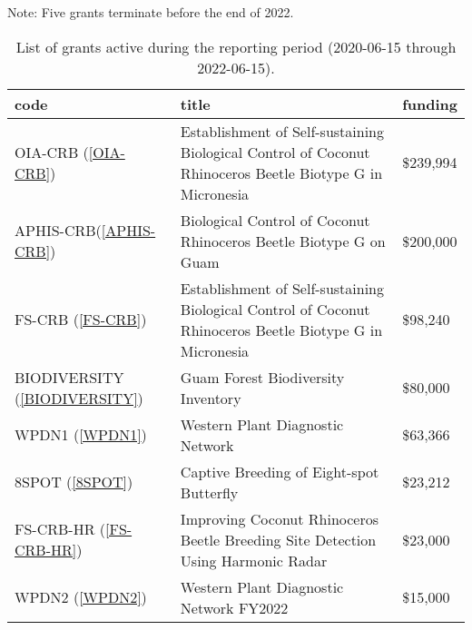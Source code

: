 Note: Five grants terminate before the end of 2022.

\begin{table}[h!]
	\centering
	\caption{List of grants active during the reporting period (2020-06-15 through 2022-06-15).}
	\label{grantlist}
	\begin{tabular}{lp{3in}>{\raggedleft\arraybackslash}l}
		\toprule
		code &                                                                                                    title &  funding \\
		\midrule
		OIA-CRB (\ref{OIA-CRB}) & Establishment of Self-sustaining Biological Control of Coconut Rhinoceros Beetle Biotype G in Micronesia & \$239,994 \\
		\midrule
		APHIS-CRB(\ref{APHIS-CRB}) &                                        Biological Control of Coconut Rhinoceros Beetle Biotype G on Guam & \$200,000 \\
		\midrule		
		FS-CRB (\ref{FS-CRB})& Establishment of Self-sustaining Biological Control of Coconut Rhinoceros Beetle Biotype G in Micronesia &  \$98,240 \\
		\midrule
		BIODIVERSITY (\ref{BIODIVERSITY}) &                                                                       Guam Forest Biodiversity Inventory &  \$80,000 \\
		\midrule		
		WPDN1 (\ref{WPDN1}) &                                                                         Western Plant Diagnostic Network &  \$63,366 \\
		\midrule
		8SPOT (\ref{8SPOT}) &                                                                 Captive Breeding of Eight-spot Butterfly &  \$23,212 \\
		\midrule
		FS-CRB-HR (\ref{FS-CRB-HR})&                         Improving Coconut Rhinoceros Beetle Breeding Site Detection Using Harmonic Radar &  \$23,000 \\
		\midrule
		WPDN2 (\ref{WPDN2}) &                                                                  Western Plant Diagnostic Network FY2022 &  \$15,000 \\
		\bottomrule
	\end{tabular}
\end{table}

